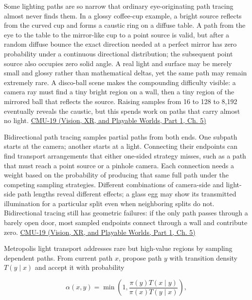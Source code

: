 Some lighting paths are so narrow that ordinary eye-originating path tracing almost never finds them. In a glossy coffee-cup example, a bright source reflects from the curved cup and forms a caustic ring on a diffuse table. A path from the eye to the table to the mirror-like cup to a point source is valid, but after a random diffuse bounce the exact direction needed at a perfect mirror has zero probability under a continuous directional distribution; the subsequent point source also occupies zero solid angle. A real light and surface may be merely small and glossy rather than mathematical deltas, yet the same path may remain extremely rare. A disco-ball scene makes the compounding difficulty visible: a camera ray must find a tiny bright region on a wall, then a tiny region of the mirrored ball that reflects the source. Raising samples from 16 to 128 to 8,192 eventually reveals the caustic, but this spends work on paths that carry almost no light. \href{../07-Vision-XR-and-Playable-Worlds-P01/main.pdf\#nameddest=04-visual-computing-ii-ch036-cmu-19---variance-reduction}{CMU-19 (Vision, XR, and Playable Worlds, Part 1, Ch. 5)}

Bidirectional path tracing samples partial paths from both ends. One subpath starts at the camera; another starts at a light. Connecting their endpoints can find transport arrangements that either one-sided strategy misses, such as a path that must reach a point source or a pinhole camera. Each connection needs a weight based on the probability of producing that same full path under the competing sampling strategies. Different combinations of camera-side and light-side path lengths reveal different effects; a glass egg may show its transmitted illumination for a particular split even when neighboring splits do not. Bidirectional tracing still has geometric failures: if the only path passes through a barely open door, most sampled endpoints connect through a wall and contribute zero. \href{../07-Vision-XR-and-Playable-Worlds-P01/main.pdf\#nameddest=04-visual-computing-ii-ch036-cmu-19---variance-reduction}{CMU-19 (Vision, XR, and Playable Worlds, Part 1, Ch. 5)}

Metropolis light transport addresses rare but high-value regions by sampling dependent paths. From current path \(x\), propose path \(y\) with transition density \(T(y\mid x)\) and accept it with probability

\[
\alpha(x,y)=\min\!\left(1,\frac{\pi(y)T(x\mid y)}{\pi(x)T(y\mid x)}\right),
\]

